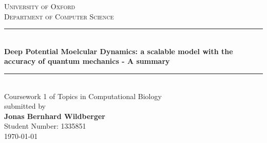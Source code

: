 \begin{titlepage}
	
	\begin{center}
		
		
		
		
		
		\textsc{\Large University of Oxford}\\[0.2cm]
		\textsc{Department of Computer Science}\\[0.2cm]
		\renewcommand{\HRule}{\rule{\linewidth}{0.5mm}}
		\HRule \\[.9cm]
		{ \huge \bfseries Deep Potential Moelcular Dynamics: a scalable model with the accuracy of quantum mechanics - A summary}\\[0.6cm]
	
		\HRule \\[1.3cm]
		
		{\LARGE Coursework 1 of Topics in Computational Biology} \\[0.3cm]  
		
		
		submitted by \\[0.3cm]  
		{\large \bfseries Jonas Bernhard Wildberger} \\
		{Student Number: 1335851}
		\\[12.5cm]  
		
		{\large \today}	
	\end{center}
	
	
\end{titlepage}
